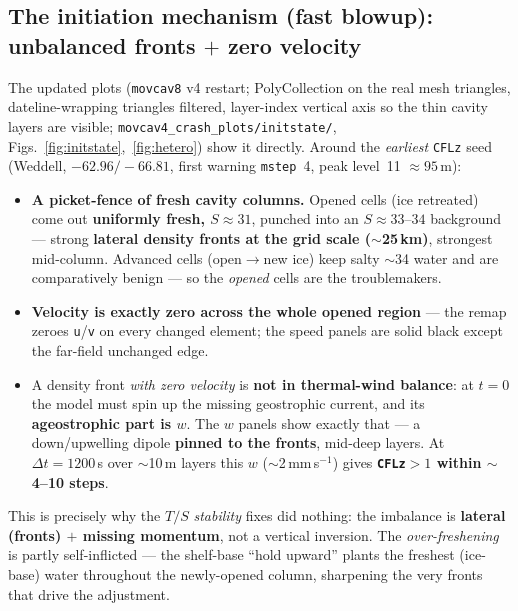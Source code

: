 \documentclass[11pt,a4paper]{article}
\newcommand{\code}[1]{\texttt{\small #1}}
\newcommand{\file}[1]{\texttt{\footnotesize #1}}
\begin{document}
\subsection{The initiation mechanism (fast blowup): unbalanced fronts $+$ zero velocity}
The updated plots (\code{movcav8} v4 restart; PolyCollection on the real mesh triangles,
dateline-wrapping triangles filtered, layer-index vertical axis so the thin cavity layers are
visible; \file{movcav4\_crash\_plots/initstate/}, Figs.~\ref{fig:initstate},~\ref{fig:hetero})
show it directly. Around the \emph{earliest} \code{CFLz} seed (Weddell, $-62.96/-66.81$, first
warning \code{mstep}~4, peak level~11 $\approx95$\,m):
\begin{itemize}[leftmargin=1.4em,itemsep=2pt]
  \item \textbf{A picket-fence of fresh cavity columns.} Opened cells (ice retreated) come out
        \textbf{uniformly fresh, $S\approx31$}, punched into an $S\approx33$--$34$ background ---
        strong \textbf{lateral density fronts at the grid scale ($\sim$25\,km)}, strongest
        mid-column. Advanced cells (open$\to$new ice) keep salty $\sim$34 water and are
        comparatively benign --- so the \emph{opened} cells are the troublemakers.
  \item \textbf{Velocity is exactly zero across the whole opened region} --- the remap zeroes
        \code{u}/\code{v} on every changed element; the speed panels are solid black except the
        far-field unchanged edge.
  \item A density front \emph{with zero velocity} is \textbf{not in thermal-wind balance}: at
        $t=0$ the model must spin up the missing geostrophic current, and its \textbf{ageostrophic
        part is $w$}. The $w$ panels show exactly that --- a down/upwelling dipole \textbf{pinned
        to the fronts}, mid-deep layers. At $\Delta t=1200$\,s over $\sim$10\,m layers this $w$
        ($\sim$2\,mm\,s$^{-1}$) gives \textbf{\code{CFLz}$>1$ within $\sim$4--10 steps}.
\end{itemize}
This is precisely why the $T/S$ \emph{stability} fixes did nothing: the imbalance is
\textbf{lateral (fronts) $+$ missing momentum}, not a vertical inversion. The
\emph{over-freshening} is partly self-inflicted --- the shelf-base ``hold upward'' plants the
freshest (ice-base) water throughout the newly-opened column, sharpening the very fronts that
drive the adjustment.
\end{document}
